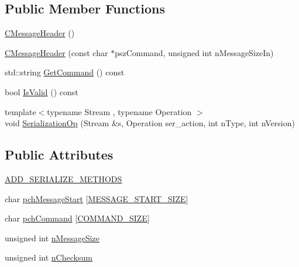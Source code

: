\subsection*{Public Member Functions}
\begin{DoxyCompactItemize}
\item 
\hyperlink{class_c_message_header_a188435dbfe51172b368873e8e7f688b0}{C\+Message\+Header} ()
\item 
\hyperlink{class_c_message_header_a4e68c30f9e7e485c13157a27c4ebff8c}{C\+Message\+Header} (const char $\ast$psz\+Command, unsigned int n\+Message\+Size\+In)
\item 
std\+::string \hyperlink{class_c_message_header_a71f022e98bff1acd65be4b75ce4cc038}{Get\+Command} () const 
\item 
bool \hyperlink{class_c_message_header_a21f5760d034d4a040b00d6c34e927be0}{Is\+Valid} () const 
\item 
{\footnotesize template$<$typename Stream , typename Operation $>$ }\\void \hyperlink{class_c_message_header_a3881923a93297c3a7a8e413ab3730408}{Serialization\+Op} (Stream \&s, Operation ser\+\_\+action, int n\+Type, int n\+Version)
\end{DoxyCompactItemize}
\subsection*{Public Attributes}
\begin{DoxyCompactItemize}
\item 
\hyperlink{class_c_message_header_a447044c3fbf9d5e98dcc4121ac808d2f}{A\+D\+D\+\_\+\+S\+E\+R\+I\+A\+L\+I\+Z\+E\+\_\+\+M\+E\+T\+H\+O\+D\+S}
\item 
char \hyperlink{class_c_message_header_a4284bf1d2fd792af89e1c93b7e6e274e}{pch\+Message\+Start} \mbox{[}\hyperlink{chainparams_8h_a6bcadada595cc3da13e6a04be1715917}{M\+E\+S\+S\+A\+G\+E\+\_\+\+S\+T\+A\+R\+T\+\_\+\+S\+I\+Z\+E}\mbox{]}
\item 
char \hyperlink{class_c_message_header_a87d62b0d9afb3889f318991700a34431}{pch\+Command} \mbox{[}\hyperlink{class_c_message_header_a00659410ff6010c972826dc3020e18b1a8c1bfc0fa6a63c8b73abef30555a5e54}{C\+O\+M\+M\+A\+N\+D\+\_\+\+S\+I\+Z\+E}\mbox{]}
\item 
unsigned int \hyperlink{class_c_message_header_a67ccb9f1f23af69e309a8d6c8bfff751}{n\+Message\+Size}
\item 
unsigned int \hyperlink{class_c_message_header_ab9c6bec3694e2c110b4f358af9e55984}{n\+Checksum}
\end{DoxyCompactItemize}


